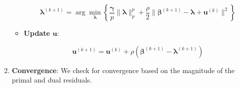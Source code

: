 \begin{enumerate}
\begin{itemize}
    \[
    \boldsymbol{\lambda}^{(k+1)} = \arg \min_{\boldsymbol{\lambda}} \left\{\frac{\boldsymbol{\gamma}}{p}\|\boldsymbol{\lambda}\|_p^p + \frac{\rho}{2}\|\boldsymbol{\beta}^{(k+1)} - \boldsymbol{\lambda} + \boldsymbol{u}^{(k)}\|^2\right\}
    \]

    \item \textbf{Update \( \boldsymbol{u} \)}:

    \[
    \boldsymbol{u}^{(k+1)} = \boldsymbol{u}^{(k)} + \rho (\boldsymbol{\beta}^{(k+1)} - \boldsymbol{\lambda}^{(k+1)})
    \]
    \end{itemize}
  \item \textbf{Convergence}: We check for convergence based on the magnitude of the primal and dual residuals.
\end{enumerate}